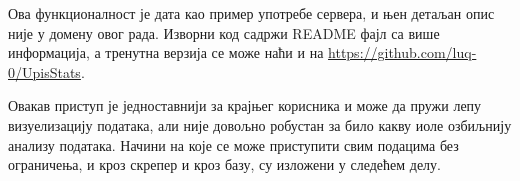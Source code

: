Ова функционалност је дата као пример употребе сервера, и њен детаљан опис није у домену овог рада. Изворни код садржи README фајл са више информација, а тренутна верзија се може наћи и на \url{https://github.com/luq-0/UpisStats}. 

Овакав приступ је једноставнији за крајњег корисника и може да пружи лепу визуелизацију података, али није довољно робустан за било какву иоле озбиљнију анализу података. Начини на које се може приступити свим подацима без ограничења, и кроз скрепер и кроз базу, су изложени у следећем делу.

